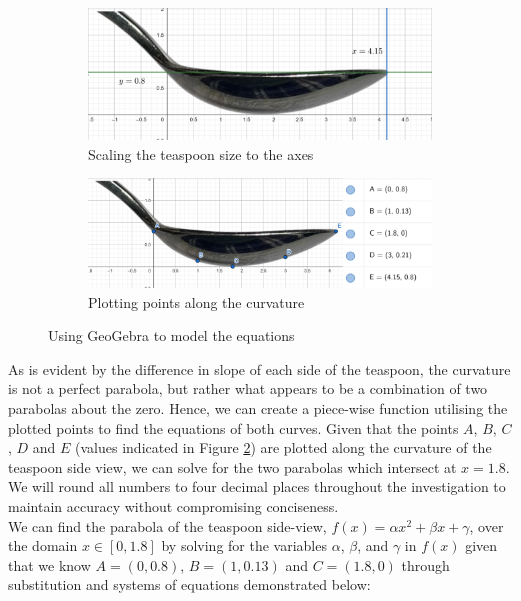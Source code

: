 \documentclass[12pt]{article}
\begin{document}
\begin{figure}[h]
     \centering
     \begin{subfigure}[b]{0.45\textwidth}
         \centering
         \includegraphics[width=\textwidth]{images/tsp bound.png}
         \caption{Scaling the teaspoon size to the axes}
         \label{fig:scale}
     \end{subfigure}
     \hfill
     \begin{subfigure}[b]{0.45\textwidth}
         \centering
         \includegraphics[width=\textwidth]{images/tsp with points.png}
         \caption{Plotting points along the curvature}
         \label{fig:plot}
     \end{subfigure}
     \hfill
        \caption{Using GeoGebra to model the equations}
        \label{fig:tsp geo1}
\end{figure}

As is evident by the difference in slope of each side of the teaspoon, the curvature is not a perfect parabola, but rather what appears to be a combination of two parabolas about the zero. Hence, we can create a piece-wise function utilising the plotted points to find the equations of both curves. 
Given that the points $A$, $B$, $C$, $D$ and $E$ (values indicated in Figure \ref{fig:plot}) are plotted along the curvature of the teaspoon side view, we can solve for the two parabolas which intersect at $x=1.8$. We will round all numbers to four decimal places throughout the investigation to maintain accuracy without compromising conciseness. \\

We can find the parabola of the teaspoon side-view, $f(x)=\alpha x^2+ \beta x+ \gamma$, over the domain $x \in [0,1.8]$ by solving for the variables $\alpha$, $\beta$, and $\gamma$ in $f(x)$ given that we know $A=(0,0.8)$, $B=(1,0.13)$ and $C=(1.8,0)$ through substitution and systems of equations demonstrated below:
\end{document}
